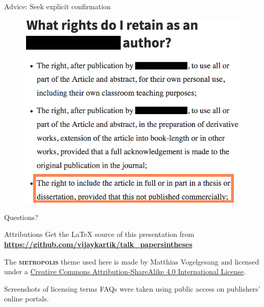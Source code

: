 \documentclass[10pt]{beamer}
\newcommand{\themename}{\textbf{\textsc{metropolis}}\xspace}
\begin{document}
\begin{frame}{Advice: Seek explicit confirmation}
	\begin{figure}
		\includegraphics[trim={0pt 0pt 0pt 0pt}, clip, width=0.9\columnwidth]{images/licenceFAQ002}
	\end{figure}
\end{frame}

{
\begin{frame}
  Questions?
\end{frame}
}

\begin{frame}{Attributions}
  Get the LaTeX source of this presentation from \textbf{\url{https://github.com/vijaykartik/talk_papersintheses}}
  \vspace{0.5in}
  
  The \themename theme used here is made by Matthias Vogelgesang and licensed under a
  \href{http://creativecommons.org/licenses/by-sa/4.0/}{Creative Commons
  Attribution-ShareAlike 4.0 International License}.
  \begin{center}\ccbysa\end{center}
  \vspace{0.5in}
  
  Screenshots of licensing terms FAQs were taken using public access on publishers' online portals.
\end{frame}
\end{document}
